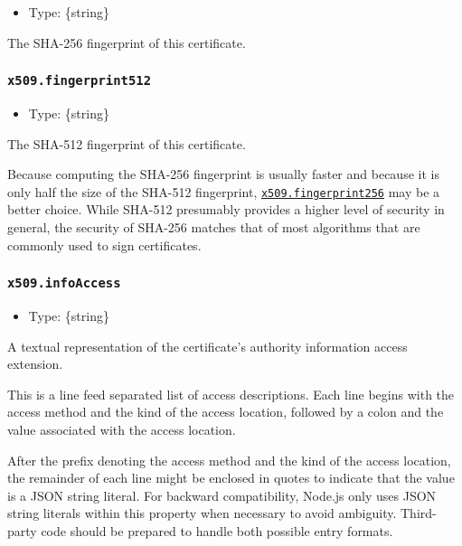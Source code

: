 \begin{itemize}
\tightlist
\item
  Type: \{string\}
\end{itemize}

The SHA-256 fingerprint of this certificate.

\subsubsection{\texorpdfstring{\texttt{x509.fingerprint512}}{x509.fingerprint512}}\label{x509.fingerprint512}

\begin{itemize}
\tightlist
\item
  Type: \{string\}
\end{itemize}

The SHA-512 fingerprint of this certificate.

Because computing the SHA-256 fingerprint is usually faster and because
it is only half the size of the SHA-512 fingerprint,
\hyperref[x509fingerprint256]{\texttt{x509.fingerprint256}} may be a
better choice. While SHA-512 presumably provides a higher level of
security in general, the security of SHA-256 matches that of most
algorithms that are commonly used to sign certificates.

\subsubsection{\texorpdfstring{\texttt{x509.infoAccess}}{x509.infoAccess}}\label{x509.infoaccess}

\begin{itemize}
\tightlist
\item
  Type: \{string\}
\end{itemize}

A textual representation of the certificate's authority information
access extension.

This is a line feed separated list of access descriptions. Each line
begins with the access method and the kind of the access location,
followed by a colon and the value associated with the access location.

After the prefix denoting the access method and the kind of the access
location, the remainder of each line might be enclosed in quotes to
indicate that the value is a JSON string literal. For backward
compatibility, Node.js only uses JSON string literals within this
property when necessary to avoid ambiguity. Third-party code should be
prepared to handle both possible entry formats.

